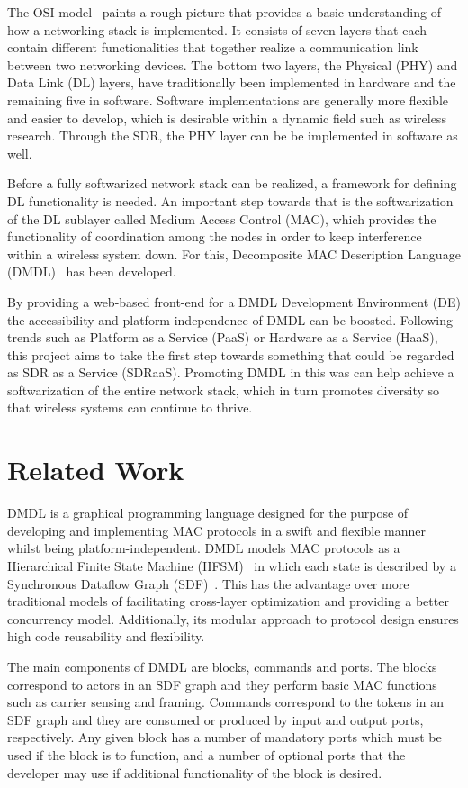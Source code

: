 \documentclass[journal,comsoc]{IEEEtran}
\begin{document}
The OSI model~\cite{osi} paints a rough picture that provides a basic understanding of
how a networking stack is implemented. It consists of seven layers that each contain different
functionalities that together realize a communication link between two networking devices. The
bottom two layers, the Physical (PHY) and Data Link (DL) layers, have traditionally been
implemented in hardware and the remaining five in software. Software implementations are generally
more flexible and easier to develop, which is desirable within a dynamic field such as wireless
research. Through the SDR, the PHY layer can be be implemented in software as well.

Before a fully softwarized network stack can be realized, a framework for defining DL functionality
is needed. An important step towards that is the softwarization of the DL sublayer
called Medium Access Control (MAC), which provides the functionality of coordination among the
nodes in order to keep interference within a wireless system down. For this,
Decomposite MAC Description Language (DMDL)~\cite{dmdl} has been developed.

By providing a web-based front-end for a DMDL Development Environment (DE) the accessibility
and platform-independence of DMDL can be boosted. Following trends such as
Platform as a Service (PaaS) or Hardware as a Service (HaaS), this project aims to take the first
step towards something that could be regarded as SDR as a Service (SDRaaS). Promoting DMDL in
this was can help achieve a softwarization of the entire network stack, which in turn promotes
diversity so that wireless systems can continue to thrive. 


\section{Related Work}
DMDL is a graphical programming language designed for the purpose of developing and implementing
MAC protocols in a swift and flexible manner whilst being platform-independent. DMDL models
MAC protocols as a Hierarchical Finite State Machine (HFSM)~\cite{hfsm} in which each state is
described by a Synchronous Dataflow Graph (SDF)~\cite{sdf}. This has the advantage over more
traditional models of facilitating cross-layer optimization and providing a better concurrency
model. Additionally, its modular approach to protocol design ensures high code reusability and
flexibility.

The main components of DMDL are blocks, commands and ports. The blocks correspond to actors
in an SDF graph and they perform basic MAC functions such as carrier sensing and framing.
Commands correspond to the tokens in an SDF graph and they are consumed or produced by input
and output ports, respectively. Any given block has a number of mandatory ports which must
be used if the block is to function, and a number of optional ports that the developer may
use if additional functionality of the block is desired.
\end{document}

